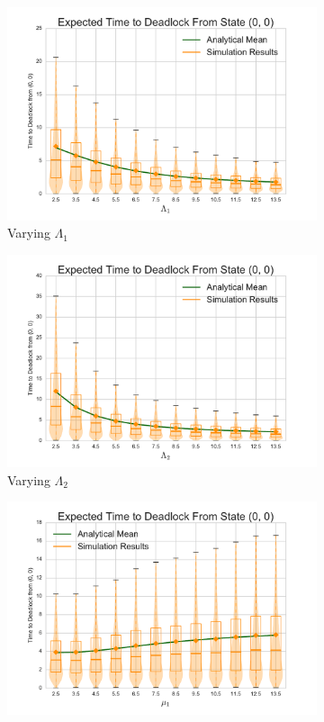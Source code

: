 \documentclass{article}
\begin{document}
\begin{figure}[!htbp]
\begin{subfigure}[b]{0.5\textwidth}
  \includegraphics[width=\textwidth]{images/vary_L1fb}
  \caption{Varying $\Lambda_1$}
  \label{fig:timestodeadlockfb_L1}
\end{subfigure}
\begin{subfigure}[b]{0.5\textwidth}
  \includegraphics[width=\textwidth]{images/vary_L2fb}
  \caption{Varying $\Lambda_2$}
  \label{fig:timestodeadlockfb_L2}
\end{subfigure}
\begin{subfigure}[b]{0.5\textwidth}
  \includegraphics[width=\textwidth]{images/vary_mu1fb}

\end{subfigure}
\end{figure}
\end{document}
